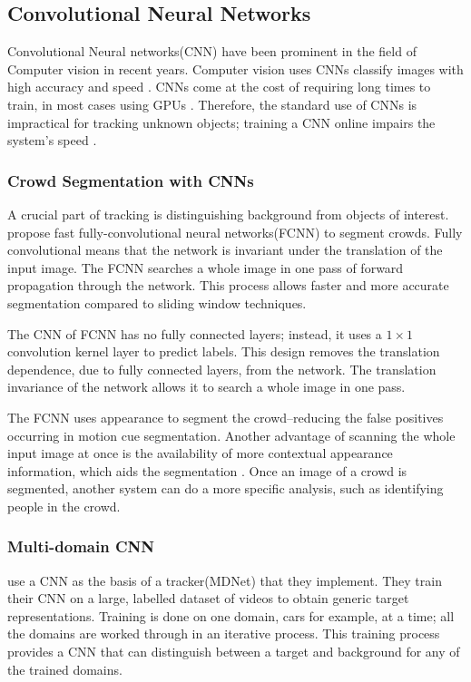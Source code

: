 \subsection{Convolutional Neural Networks}
  Convolutional Neural networks(CNN) have been prominent in the field of Computer vision in recent years.
  Computer vision uses CNNs classify images with high accuracy and speed \cite{razavian2014}.
  CNNs come at the cost of requiring long times to train, in most cases using GPUs \cite{krizhevsky2012}.
  Therefore, the standard use of CNNs is impractical for tracking unknown objects; training a CNN online impairs the system's speed \cite{bertinetto2016}.

  \subsubsection{Crowd Segmentation with CNNs}
  A crucial part of tracking is distinguishing background from objects of interest.
  \citet{kang2014} propose fast fully-convolutional neural networks(FCNN) to segment crowds.
  Fully convolutional means that the network is invariant under the translation of the input image.
  The FCNN searches a whole image in one pass of forward propagation through the network.
  This process allows faster and more accurate segmentation compared to sliding window techniques.

  The CNN of FCNN has no fully connected layers; instead, it uses a $1 \times 1$ convolution kernel layer to predict labels.
  This design removes the translation dependence, due to fully connected layers, from the network.
  The translation invariance of the network allows it to search a whole image in one pass.

  The FCNN uses appearance to segment the crowd--reducing the false positives occurring in motion cue segmentation.
  Another advantage of scanning the whole input image at once is the availability of more contextual appearance information, which aids the segmentation \cite{eigenFacesRecog, farabet2012}.
  Once an image of a crowd is segmented, another system can do a more specific analysis, such as identifying people in the crowd.

  \subsubsection{Multi-domain CNN}
  \citet{CNNTracking} use a CNN as the basis of a tracker(MDNet) that they implement. 
  They train their CNN on a large, labelled dataset of videos to obtain generic target representations.
  Training is done on one domain, cars for example, at a time; all the domains are worked through in an iterative process.
  This training process provides a CNN that can distinguish between a target and background for any of the trained domains.

